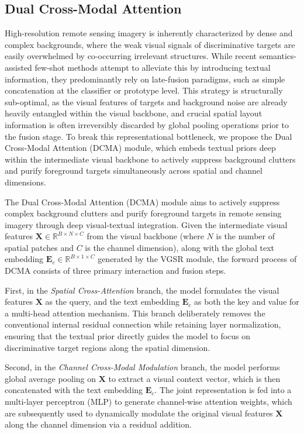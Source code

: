 \documentclass[lettersize,journal]{IEEEtran}
\begin{document}
\subsection{Dual Cross-Modal Attention}
\label{sec:dcma}

High-resolution remote sensing imagery is inherently characterized by dense and complex backgrounds, where the weak visual signals of discriminative targets are easily overwhelmed by co-occurring irrelevant structures. 
While recent semantics-assisted few-shot methods \cite{CNSPN,ProDFSL} attempt to alleviate this by introducing textual information, they predominantly rely on late-fusion paradigms, such as simple concatenation at the classifier or prototype level. 
This strategy is structurally sub-optimal, as the visual features of targets and background noise are already heavily entangled within the visual backbone, and crucial spatial layout information is often irreversibly discarded by global pooling operations prior to the fusion stage.
To break this representational bottleneck, we propose the Dual Cross-Modal Attention (DCMA) module, which embeds textual priors deep within the intermediate visual backbone to actively suppress background clutters and purify foreground targets simultaneously across spatial and channel dimensions.

The Dual Cross-Modal Attention (DCMA) module aims to actively suppress complex background clutters and purify foreground targets in remote sensing imagery through deep visual-textual integration. 
Given the intermediate visual features $\mathbf{X} \in \mathbb{R}^{B \times N \times C}$ from the visual backbone (where $N$ is the number of spatial patches and $C$ is the channel dimension), along with the global text embedding $\mathbf{E}_c \in \mathbb{R}^{B \times 1 \times C}$ generated by the VGSR module, the forward process of DCMA consists of three primary interaction and fusion steps. 

First, in the \textit{Spatial Cross-Attention} branch, the model formulates the visual features $\mathbf{X}$ as the query, and the text embedding $\mathbf{E}_c$ as both the key and value for a multi-head attention mechanism. 
This branch deliberately removes the conventional internal residual connection while retaining layer normalization, ensuring that the textual prior directly guides the model to focus on discriminative target regions along the spatial dimension. 

Second, in the \textit{Channel Cross-Modal Modulation} branch, the model performs global average pooling on $\mathbf{X}$ to extract a visual context vector, which is then concatenated with the text embedding $\mathbf{E}_c$. 
The joint representation is fed into a multi-layer perceptron (MLP) to generate channel-wise attention weights, which are subsequently used to dynamically modulate the original visual features $\mathbf{X}$ along the channel dimension via a residual addition. 
\end{document}
